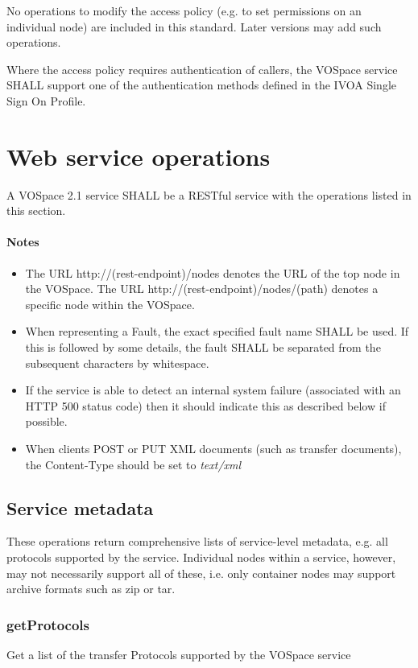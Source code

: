 \documentclass[11pt,a4paper]{ivoa}
\begin{document}
No operations to modify the access policy (e.g. to set permissions on an individual node) are included in this standard. Later versions may add such operations.

Where the access policy requires authentication of callers, the VOSpace service SHALL support one of the authentication methods defined in the IVOA Single Sign On Profile.

\section{Web service operations}
\label{sec:web service operations}

A VOSpace 2.1 service SHALL be a RESTful service with the operations listed in this section.

\paragraph{Notes}
\begin{itemize}
    \item The URL http://(rest-endpoint)/nodes denotes the URL of the top node in the VOSpace. The URL http://(rest-endpoint)/nodes/(path) denotes a specific node within the VOSpace.
    \item When representing a Fault, the exact specified fault name SHALL be used. If this is followed by some details, the fault SHALL be separated from the subsequent characters by whitespace.
    \item If the service is able to detect an internal system failure (associated with an HTTP 500 status code) then it should indicate this as described below if possible.
    \item When clients POST or PUT XML documents (such as transfer documents), the Content-Type should be set to \emph{text/xml}
\end{itemize}

\subsection{Service metadata}
\label{subsec:service metadata}
These operations return comprehensive lists of service-level metadata, e.g. all protocols supported by the service. Individual nodes within a service, however, may not necessarily support all of these, i.e. only container nodes may support archive formats such as zip or tar.

\subsubsection{getProtocols}
\label{subsubsec:getprotocols}
Get a list of the transfer Protocols supported by the VOSpace service
\end{document}
